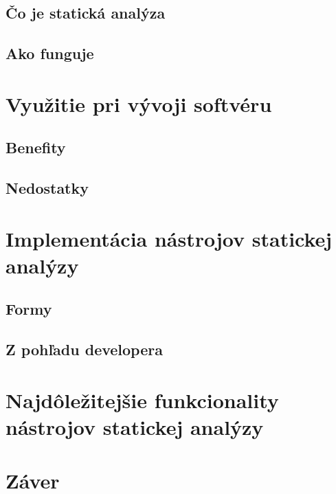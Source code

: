 \documentclass[11pt,twoside,slovak,a4paper]{article}
\begin{document}
\subsection{Čo je statická analýza} \label{principy:co}
\subsection{Ako funguje} \label{principy:ako}

\section{Využitie pri vývoji softvéru} \label{vyuzitie}
\subsection{Benefity} \label{vyuzitie:benefity}
\subsection{Nedostatky} \label{vyuzitie:nedostatky}

\section{Implementácia nástrojov statickej analýzy} \label{implementacia}
\subsection{Formy}\label{implementacia:formy}
\subsection{Z pohľadu developera}\label{implementacia:dev}

\section{Najdôležitejšie funkcionality nástrojov statickej analýzy} \label{funkcionality}

\section{Záver}
\end{document}
